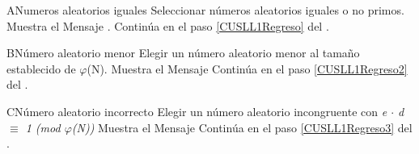 
		
\begin{UCtrayectoriaA}{A}{Numeros aleatorios iguales}
	\UCpaso Seleccionar números aleatorios iguales o no primos.
	\UCpaso Muestra el Mensaje .
	\UCpaso Continúa en el paso \ref{CUSLL1Regreso} del .
\end{UCtrayectoriaA}

\begin{UCtrayectoriaA}{B}{Número aleatorio menor}
	\UCpaso Elegir un número aleatorio menor al tamaño establecido de $\varphi$(N).
	\UCpaso Muestra el Mensaje 
	\UCpaso Continúa en el paso \ref{CUSLL1Regreso2} del .
\end{UCtrayectoriaA}

\begin{UCtrayectoriaA}{C}{Número aleatorio incorrecto}
	\UCpaso Elegir un número aleatorio incongruente con \textit{e $\cdot$ d $\equiv$ 1 (mod $\varphi$(N))} 
	\UCpaso Muestra el Mensaje 
	\UCpaso Continúa en el paso \ref{CUSLL1Regreso3} del .
\end{UCtrayectoriaA}

